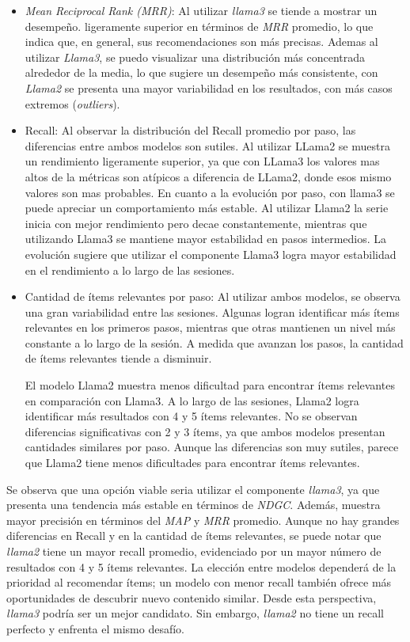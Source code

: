 \documentclass[11pt,a4paper,twoside]{thesis}
\begin{document}
\begin{itemize}
	\item \textit{Mean Reciprocal Rank (MRR)}: Al utilizar \textit{llama3} se tiende a mostrar un desempeño. ligeramente superior en términos de \textit{MRR} promedio, lo que indica que, en general, sus recomendaciones son más precisas. Ademas al utilizar \textit{Llama3}, se puedo visualizar una distribución más concentrada alrededor de la media, lo que sugiere un desempeño más consistente, con \textit{Llama2} se presenta una mayor variabilidad en los resultados, con más casos extremos (\textit{outliers}).

	\item Recall: Al observar la distribución del Recall promedio por paso, las diferencias entre ambos modelos son sutiles. Al utilizar LLama2 se muestra un rendimiento ligeramente superior, ya que con LLama3 los valores mas altos de la métricas son atípicos a diferencia de LLama2, donde esos mismo valores son mas probables. En cuanto a la evolución por paso, con llama3 se puede apreciar un comportamiento más estable. Al utilizar Llama2 la serie inicia con mejor rendimiento pero decae constantemente, mientras que utilizando Llama3 se mantiene mayor estabilidad en pasos intermedios. La evolución sugiere que utilizar el componente Llama3 logra mayor estabilidad en el rendimiento a lo largo de las sesiones.

	\item Cantidad de ítems relevantes por paso: Al utilizar ambos modelos, se observa una gran variabilidad entre las sesiones. Algunas logran identificar más ítems relevantes en los primeros pasos, mientras que otras mantienen un nivel más constante a lo largo de la sesión. A medida que avanzan los pasos, la cantidad de ítems relevantes tiende a disminuir.

	      El modelo Llama2 muestra menos dificultad para encontrar ítems relevantes en comparación con Llama3. A lo largo de las sesiones, Llama2 logra identificar más resultados con 4 y 5 ítems relevantes. No se observan diferencias significativas con 2 y 3 ítems, ya que ambos modelos presentan cantidades similares por paso. Aunque las diferencias son muy sutiles, parece que Llama2 tiene menos dificultades para encontrar ítems relevantes.

\end{itemize}

Se observa que una opción viable seria utilizar el componente \textit{llama3}, ya que presenta una tendencia más estable en términos de \textit{NDGC}. Además, muestra mayor precisión en términos del \textit{MAP} y \textit{MRR} promedio. Aunque no hay grandes diferencias en Recall y en la cantidad de ítems relevantes, se puede notar que \textit{llama2} tiene un mayor recall promedio, evidenciado por un mayor número de resultados con 4 y 5 ítems relevantes. La elección entre modelos dependerá de la prioridad al recomendar ítems; un modelo con menor recall también ofrece más oportunidades de descubrir nuevo contenido similar. Desde esta perspectiva, \textit{llama3} podría ser un mejor candidato. Sin embargo, \textit{llama2} no tiene un recall perfecto y enfrenta el mismo desafío.
\end{document}
